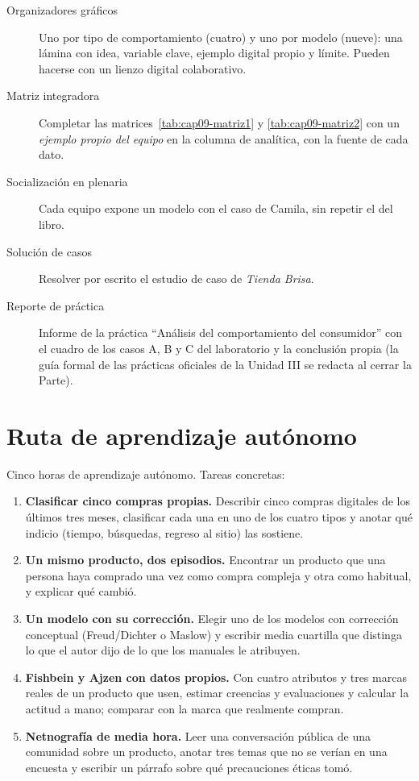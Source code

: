 \begin{description}
  \item[Organizadores gráficos] Uno por tipo de comportamiento (cuatro) y uno por
  modelo (nueve): una lámina con idea, variable clave, ejemplo digital propio y
  límite. Pueden hacerse con un lienzo digital colaborativo.
  \item[Matriz integradora] Completar las matrices~\ref{tab:cap09-matriz1} y
  \ref{tab:cap09-matriz2} con un \emph{ejemplo propio del equipo} en la
  columna de analítica, con la fuente de cada dato.
  \item[Socialización en plenaria] Cada equipo expone un modelo con el
  caso de Camila, sin repetir el del libro.
  \item[Solución de casos] Resolver por escrito el estudio de caso de
  \textit{Tienda Brisa}.
  \item[Reporte de práctica] Informe de la práctica \enquote{Análisis del
  comportamiento del consumidor} con el cuadro de los casos A, B y C del
  laboratorio y la conclusión propia (la guía formal de las prácticas oficiales de la
  Unidad III se redacta al cerrar la Parte).
\end{description}

\section{Ruta de aprendizaje autónomo}

Cinco horas de aprendizaje autónomo. Tareas concretas:
\begin{enumerate}
  \item \textbf{Clasificar cinco compras propias.} Describir cinco compras
  digitales de los últimos tres meses, clasificar cada una en uno de los cuatro
  tipos y anotar qué indicio (tiempo, búsquedas, regreso al sitio) las sostiene.
  \item \textbf{Un mismo producto, dos episodios.} Encontrar un producto que una
  persona haya comprado una vez como compra compleja y otra como habitual, y
  explicar qué cambió.
  \item \textbf{Un modelo con su corrección.} Elegir uno de los modelos con
  corrección conceptual (Freud/Dichter o Maslow) y escribir media cuartilla
  que distinga lo que el autor dijo de lo que los manuales le atribuyen.
  \item \textbf{Fishbein y Ajzen con datos propios.} Con cuatro atributos y tres
  marcas reales de un producto que usen, estimar creencias y evaluaciones y
  calcular la actitud a mano; comparar con la marca que realmente compran.
  \item \textbf{Netnografía de media hora.} Leer una conversación pública de una
  comunidad sobre un producto, anotar tres temas que no se verían en una
  encuesta y escribir un párrafo sobre qué precauciones éticas tomó.
\end{enumerate}

